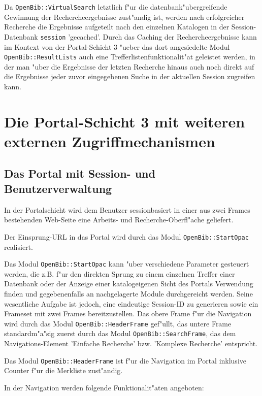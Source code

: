 \documentclass[11pt, twoside, a4paper, BCOR8mm, DIV12, bibtotoc,idxtotoc]{scrbook}
\begin{document}
Da \texttt{OpenBib::VirtualSearch} letztlich f"ur die
datenbank"ubergreifende Gewinnung der Recherche\-er\-geb\-nisse
zust"andig ist, werden nach erfolgreicher Recherche die Ergebnisse
aufgeteilt nach den einzelnen Katalogen in der Session-Datenbank
\texttt{session} 'gecached'. Durch das Caching der
Re\-cher\-che\-ergebnisse kann im Kontext von der Portal-Schicht 3
"ueber das dort angesiedelte Modul \texttt{OpenBib::ResultLists} auch
eine Trefferlistenfunktionalit"at geleistet werden, in der man "uber
die Ergebnisse der letzten Recherche hinaus auch noch direkt auf die
Ergebnisse jeder zuvor eingegebenen Suche in der aktuellen Session
zugreifen kann.

\section{Die Portal-Schicht 3 mit weiteren externen Zugriffmechanismen}

\subsection{Das Portal mit Session- und Benutzerverwaltung}

In der Portalschicht wird dem Benutzer sessionbasiert in einer aus
zwei Frames bestehenden Web-Seite eine Arbeits- und Recherche-Oberfl"ache
geliefert. 

Der Einsprung-URL in das Portal wird durch das Modul
\texttt{OpenBib::StartOpac} realisiert.

Das Modul \texttt{OpenBib::StartOpac} kann "uber verschiedene
Parameter gesteuert werden, die z.B. f"ur den direkten Sprung zu einem
einzelnen Treffer einer Datenbank oder der Anzeige einer
katalogeigenen Sicht des Portals Verwendung finden und gegebenenfalls
an nachgelagerte Module durchgereicht werden. Seine wesentliche
Aufgabe ist jedoch, eine eindeutige Session-ID zu generieren sowie ein
Frameset mit zwei Frames bereitzustellen.  Das obere Frame f"ur die
Navigation wird durch das Modul \texttt{OpenBib::HeaderFrame}
gef"ullt, das untere Frame standardm"a"sig zuerst durch das Modul
\texttt{OpenBib::SearchFrame}, das dem Navigations-Element 'Einfache
Recherche' bzw. 'Komplexe Recherche' entspricht.

Das Modul \texttt{OpenBib::HeaderFrame} ist f"ur die Navigation im Portal
inklusive Counter f"ur die Merkliste zust"andig.

In der Navigation werden folgende Funktionalit"aten angeboten:
\end{document}
